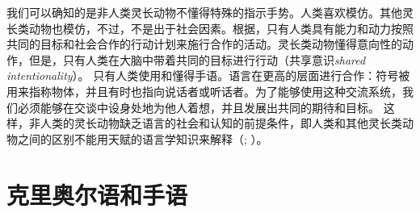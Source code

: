 我们可以确知的是非人类灵长动物不懂得特殊的指示手势。人类喜欢模仿。其他灵长类动物也模仿，不过，不是出于社会因素\citep[--10]{Tomasello2006c}。根据\citet[]{TCCBM2005a}，只有人类具有能力和动力按照共同的目标和社会合作的行动计划来施行合作的活动。灵长类动物懂得意向性的动作，但是，只有人类在大脑中带着共同的目标进行行动（共享意识\emph{shared intentionality}）。
只有人类使用和懂得手语\citep[, 724, 726]{TCCBM2005a}。语言在更高的层面进行合作：符号被用来指称物体，并且有时也指向说话者或听话者。为了能够使用这种交流系统，我们必须能够在交谈中设身处地为他人着想，并且发展出共同的期待和目标\citep[]{TCCBM2005a}。
这样，非人类的灵长动物缺乏语言的社会和认知的前提条件，即人类和其他灵长类动物之间的区别不能用天赋的语言学知识来解释（\citealp[Section~8.1.2]{Tomasello2003a};
\citealp{TCCBM2005a}）。

\section{克里奥尔语和手语}

